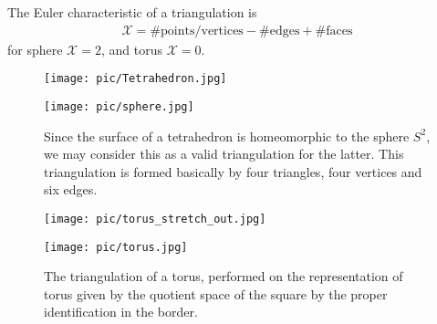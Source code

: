 \documentclass[10pt]{article}
\begin{document}
            \begin{definition}
                The Euler characteristic of a triangulation is
                \begin{equation*}
                    \begin{aligned}
                        \mathcal{X} = \#\text{points/vertices} - \#\text{edges} + \#\text{faces}
                    \end{aligned}
                \end{equation*}
                for sphere $\mathcal{X} = 2$, and torus $\mathcal{X} = 0$.
            \end{definition}
            \begin{figure}[htbp]
        	\centering
        	\begin{minipage}{0.49\linewidth}
        		\centering
        		\texttt{[image: pic/Tetrahedron.jpg]}
        	\end{minipage}
        	\begin{minipage}{0.49\linewidth}
        		\centering
        		\texttt{[image: pic/sphere.jpg]}
        	\end{minipage}
                \caption{Since the surface of a tetrahedron is homeomorphic to the sphere $S^2$, we may consider this as a valid triangulation for the latter. This triangulation is formed basically by four triangles, four vertices and six edges.}
            \end{figure}
            \begin{figure}[htbp]
        	\centering
        	\begin{minipage}{0.49\linewidth}
        		\centering
        		\texttt{[image: pic/torus\_stretch\_out.jpg]}
        	\end{minipage}
        	\begin{minipage}{0.49\linewidth}
        		\centering
        		\texttt{[image: pic/torus.jpg]}
        	\end{minipage}
                \caption{The triangulation of a torus, performed on the representation of torus given by the quotient space of the square by the proper identification in the border.}
            \end{figure}
\end{document}
